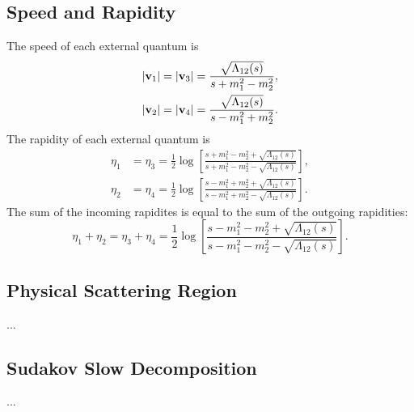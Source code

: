 \subsection{Speed and Rapidity}
The speed of each external quantum is
\begin{align}
	\left\lvert \mathbf{v}_{1} \right\rvert &= \left\lvert \mathbf{v}_{3} \right\rvert = \frac{\sqrt{\Lambda_{12}(s)}}{s + m_{1}^{2} - m_{2}^{2}}, \\
	\left\lvert \mathbf{v}_{2} \right\rvert &= \left\lvert \mathbf{v}_{4} \right\rvert = \frac{\sqrt{\Lambda_{12}(s)}}{s - m_{1}^{2} + m_{2}^{2}}.
\end{align}
The rapidity of each external quantum is
\begin{align}
	\eta_{1} &= \eta_{3} = \frac{1}{2} \log{\left[\frac{s + m_{1}^{2} - m_{2}^{2} + \sqrt{\Lambda_{12}(s)}}{s + m_{1}^{2} - m_{2}^{2} - \sqrt{\Lambda_{12}(s)}}\right]}, \\
	\eta_{2} &= \eta_{4} = \frac{1}{2} \log{\left[\frac{s - m_{1}^{2} + m_{2}^{2} + \sqrt{\Lambda_{12}(s)}}{s - m_{1}^{2} + m_{2}^{2} - \sqrt{\Lambda_{12}(s)}}\right]}.
\end{align}
The sum of the incoming rapidites is equal to the sum of the outgoing rapidities:
\begin{equation}
	\eta_{1} + \eta_{2} = \eta_{3} + \eta_{4} = \frac{1}{2} \log{\left[ \frac{s - m_{1}^{2} - m_{2}^{2} + \sqrt{\Lambda_{12}(s)}}{s - m_{1}^{2} - m_{2}^{2} - \sqrt{\Lambda_{12}(s)}} \right]}.
\end{equation}
\subsection{Physical Scattering Region}
...
\subsection{Sudakov Slow Decomposition}
...
